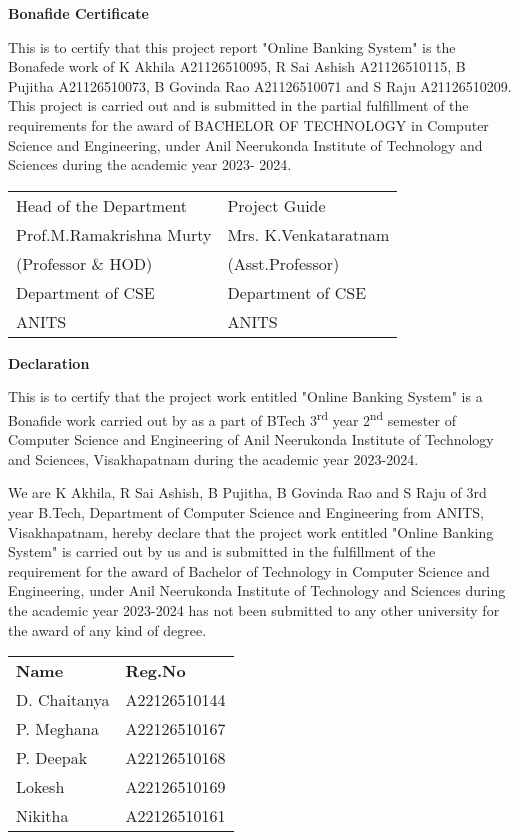 \documentclass[12pt,a4paper]{report}
\begin{document}
\thispagestyle{empty}
\begin{center}
    \Large\textbf{Bonafide Certificate}
\end{center}
\vspace{1cm}

This is to certify that this project report "Online Banking System" is the Bonafede
work of K Akhila A21126510095, R Sai Ashish A21126510115, B Pujitha
A21126510073, B Govinda Rao A21126510071 and S Raju A21126510209. This
project is carried out and is submitted in the partial fulfillment of the requirements for
the award of BACHELOR OF TECHNOLOGY in Computer Science and
Engineering, under Anil Neerukonda Institute of Technology and Sciences during the
academic year 2023- 2024.

\vspace{2cm}
\begin{tabular}{ll}
Head of the Department & Project Guide \\
Prof.M.Ramakrishna Murty & Mrs. K.Venkataratnam \\
(Professor \& HOD) & (Asst.Professor) \\
Department of CSE & Department of CSE \\
ANITS & ANITS
\end{tabular}
\newpage

\thispagestyle{empty}
\begin{center}
    \Large\textbf{Declaration}
\end{center}
\vspace{1cm}

This is to certify that the project work entitled "Online Banking System" is a
Bonafide work carried out by as a part of BTech 3\textsuperscript{rd} year 2\textsuperscript{nd} semester of Computer
Science and Engineering of Anil Neerukonda Institute of Technology and Sciences,
Visakhapatnam during the academic year 2023-2024.

We are K Akhila, R Sai Ashish, B Pujitha, B Govinda Rao and S Raju of 3rd year
B.Tech, Department of Computer Science and Engineering from ANITS,
Visakhapatnam, hereby declare that the project work entitled "Online Banking
System" is carried out by us and is submitted in the fulfillment of the requirement for
the award of Bachelor of Technology in Computer Science and Engineering, under
Anil Neerukonda Institute of Technology and Sciences during the academic year
2023-2024 has not been submitted to any other university for the award of any kind of
degree.

\vspace{2cm}
\begin{tabular}{ll}
\textbf{Name} & \textbf{Reg.No} \\
D. Chaitanya & A22126510144 \\
P. Meghana & A22126510167 \\
P. Deepak & A22126510168 \\
Lokesh & A22126510169 \\
Nikitha & A22126510161 \\
\end{tabular}
\newpage
\end{document}
